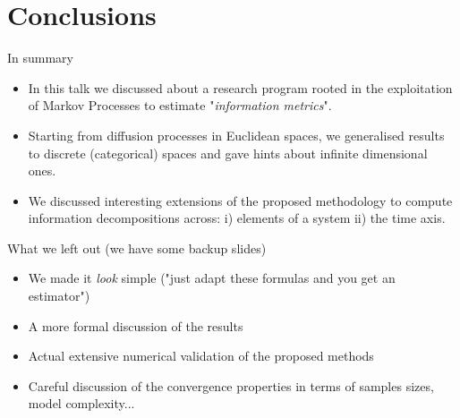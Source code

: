 \section{Conclusions}
\begin{frame}{In summary}
\begin{itemize}
    \item In this talk we discussed about a research program rooted in the exploitation of Markov Processes to estimate "\textit{information metrics}".
    \item Starting from diffusion processes in Euclidean spaces, we generalised results to discrete (categorical) spaces and gave hints about infinite dimensional ones.
    \item We discussed interesting extensions of the proposed methodology to compute information decompositions across: i) elements of a system ii) the time axis.
\end{itemize}
What we left out (we have some backup slides)
\begin{itemize}
\item We made it \textit{look} simple ("just adapt these formulas and you get an estimator")
    \item A more formal discussion of the results
    \item Actual extensive numerical validation of the proposed methods
    \item Careful discussion of the convergence properties in terms of samples sizes, model complexity...
\end{itemize}
    
\end{frame}